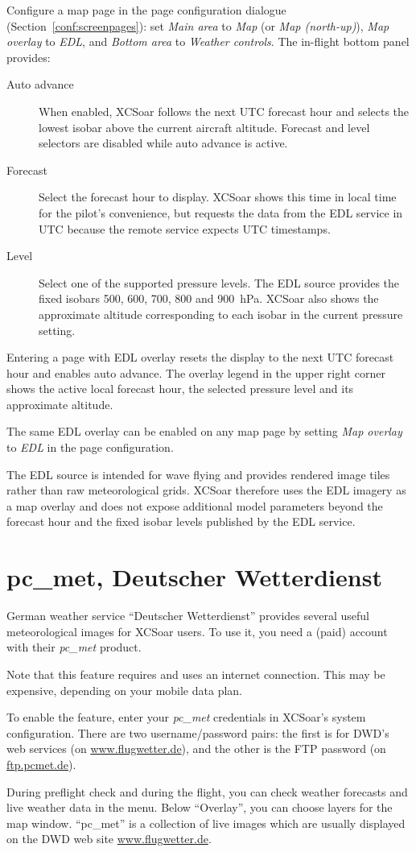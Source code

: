 Configure a map page in the page configuration dialogue
(Section~\ref{conf:screenpages}): set \emph{Main area} to \emph{Map}
(or \emph{Map (north-up)}), \emph{Map overlay} to \emph{EDL}, and
\emph{Bottom area} to \emph{Weather controls}.  The in-flight bottom
panel provides:
\begin{description}
\item[Auto advance] When enabled, XCSoar follows the next UTC forecast
  hour and selects the lowest isobar above the current aircraft
  altitude.  Forecast and level selectors are disabled while auto advance
  is active.
\item[Forecast] Select the forecast hour to display.  XCSoar shows this
  time in local time for the pilot's convenience, but requests the data
  from the EDL service in UTC because the remote service expects UTC
  timestamps.
\item[Level] Select one of the supported pressure levels.  The EDL
  source provides the fixed isobars 500, 600, 700, 800 and 900~hPa.
  XCSoar also shows the approximate altitude corresponding to each
  isobar in the current pressure setting.
\end{description}

Entering a page with EDL overlay resets the display to the next UTC
forecast hour and enables auto advance.  The overlay legend in the upper
right corner shows the active local forecast hour, the selected pressure
level and its approximate altitude.

The same EDL overlay can be enabled on any map page by setting
\emph{Map overlay} to \emph{EDL} in the page configuration.

The EDL source is intended for wave flying and provides rendered image
tiles rather than raw meteorological grids.  XCSoar therefore uses the
EDL imagery as a map overlay and does not expose additional model
parameters beyond the forecast hour and the fixed isobar levels
published by the EDL service.

\section{pc\_met, Deutscher Wetterdienst}\label{sec:pcmet}

German weather service ``Deutscher Wetterdienst'' provides several
useful meteorological images for XCSoar users.  To use it, you need a
(paid) account with their \emph{pc\_met} product.

Note that this feature requires and uses an internet connection.  This
may be expensive, depending on your mobile data plan.

To enable the feature, enter your \emph{pc\_met} credentials in
XCSoar's system configuration.  There are two username/password pairs:
the first is for DWD's web services (on \url{www.flugwetter.de}),
and the other is the FTP password (on \url{ftp.pcmet.de}).

During preflight check and during the flight, you can check weather
forecasts and live weather data in the
  menu.
Below ``Overlay'', you can choose layers for the map window.
``pc\_met'' is a collection of live images which are usually displayed
on the DWD web site \url{www.flugwetter.de}.

